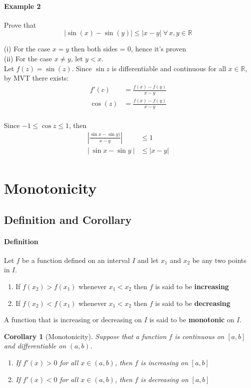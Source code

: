 \documentclass[12pt]{article}
\newtheorem{corollary}{Corollary}
\begin{document}
\paragraph{Example 2} Prove that
\[
    | \sin (x) - \sin (y)| \leq |x - y| \; \forall \, x, y \in \mathbb{R}
\]

(i) For the case $x = y$ then both sides = 0, hence it's proven \\ 
(ii) For the case $x \neq y$, let $y < x$. \\
Let $f(z) = \sin(z)$. Since $\sin z$ is differentiable and continuous for all $x \in \mathbb{R}$, by MVT there exists:
\begin{align*} 
    f'(c) &= \frac{f(x) - f(y)}{x - y} \\
    \cos (z) &=  \frac{f(x) - f(y)}{x - y} \\
\end{align*}

Since $-1 \leq \cos z \leq 1$, then
\begin{align*} 
    \left|\frac{\sin x - \sin y)}{x - y} \right| &\leq 1 \\
    \left|\:  \sin x - \sin y\: \right| &\leq |x - y| \\
\end{align*}
    
\section{Monotonicity}
\subsection{Definition and Corollary}
\paragraph{Definition} Let $f$ be a function defined on an interval $I$ and let $x_1$ and $x_2$ be any two points in $I$.
\begin{enumerate} 
     \item If $f(x_2) > f(x_1)$ whenever $x_1 < x_2$ then $f$ is said to be \textbf{increasing}
     \item If $f(x_2) < f(x_1)$ whenever $x_1 < x_2$ then $f$ is said to be \textbf{decreasing}
\end{enumerate}
A function that is increasing or decreasing on $I$ is said to be \textbf{monotonic} on $I$.

\begin{corollary}[Monotonicity]
    Suppose that a function $f$ is continuous on $[a, b]$ and differentiable on $(a,b)$.
    \begin{enumerate} 
        \item If $f'(x) > 0$ for all $x \in (a,b)$, then $f$ is increasing on $[a, b]$
        \item If $f'(x) < 0$ for all $x \in (a,b)$, then $f$ is decreasing on $[a, b]$
   \end{enumerate}
\end{corollary}
\end{document}
